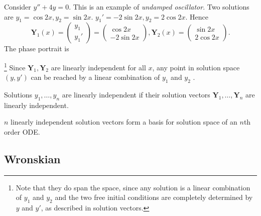 \documentclass[a4paper]{article}
\begin{document}
    \begin{example}
        Consider $ y''+4y=0 $. This is an example of \textit{undamped oscillator}. Two solutions are $ y_1=\cos 2x, y_2=\sin 2x $. $ y_1'=-2 \sin 2x, y_2= 2 \cos 2x $. Hence 
        \[
            \mathbf{Y}_1(x)=\begin{pmatrix}
                y_1\\y_1'
            \end{pmatrix}=\begin{pmatrix}
                \cos 2x\\-2 \sin 2x
            \end{pmatrix}, \mathbf{Y}_2(x)=\begin{pmatrix}
                \sin 2x\\2 \cos 2x
            \end{pmatrix}
        .\]
        The phase portrait is 
        \begin{center}
          \end{center}
          \footnote{Note that they do span the space, since any solution is a linear combination of $y_1$ and $y_2$ and the two free initial conditions are completely determined by $y$ and $y'$, as described in solution vectors.}
          Since $\mathbf{Y}_1,\mathbf{Y}_2$ are linearly independent for all $x$, any point in solution space $(y,y')$ can be reached by a linear combination of $y_1$ and $y_2$ .
    \end{example}

    Solutions $y_1,\dots,y_n$ are linearly independent if their solution vectors $ \mathbf{Y}_1,\dots,\mathbf{Y}_n $ are linearly independent.

    $n$ linearly independent solution vectors form a basis for solution space of an $n$th order ODE.
    \subsection{Wronskian}
\end{document}
